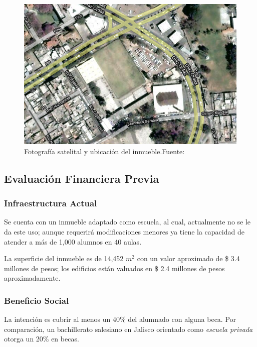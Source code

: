 \begin{figure}
	\centering
	\includegraphics[scale=0.5]{images/localizacion}
	\caption[Fotografía satelital y ubicación del inmueble.]{Fotografía satelital y ubicación del inmueble.\newline Fuente: \citep{GoogleMaps2010}}
	\label{fig:ubicacion}
\end{figure}

\subsection{Evaluación Financiera Previa}

\subsubsection{Infraestructura Actual}

Se cuenta con un inmueble adaptado como escuela, al cual, actualmente no se le da este uso; aunque requerirá modificaciones menores ya tiene la capacidad de atender a más de 1,000 alumnos en 40 aulas.

La superficie del inmueble es de 14,452 $m^2$ con un valor aproximado de \$ 3.4 millones de pesos; los edificios están valuados en \$ 2.4 millones de pesos aproximadamente.


\subsubsection{Beneficio Social}
\label{sub:sub:Beneficio:Social}

La intención es cubrir al menos un 40\% del alumnado con alguna beca. Por comparación, un bachillerato salesiano en Jalisco orientado como \emph{escuela privada} otorga un 20\% en becas.

